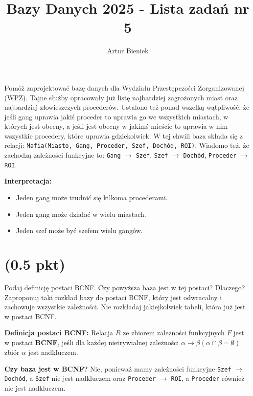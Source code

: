 \documentclass{article}
\begin{document}
\title{Bazy Danych 2025 - Lista zadań nr 5}
\author{Artur Bieniek}

\maketitle

Pomóż zaprojektować bazę danych dla Wydziału Przestępczości Zorganizowanej (WPZ). Tajne służby opracowały już listę najbardziej zagrożonych miast oraz najbardziej złowieszczych procederów. Ustalono też ponad wszelką wątpliwość, że jeśli gang uprawia jakiś proceder to uprawia go we wszystkich miastach, w których jest obecny, a jeśli jest obecny w jakimś mieście to uprawia w nim wszystkie procedery, które uprawia gdziekolwiek. W tej chwili baza składa się z relacji: \texttt{Mafia(Miasto, Gang, Proceder, Szef, Dochód, ROI)}. Wiadomo też, że zachodzą zależności funkcyjne to: \texttt{Gang} $\rightarrow$ \texttt{Szef}, \texttt{Szef} $\rightarrow$ \texttt{Dochód}, \texttt{Proceder} $\rightarrow$ \texttt{ROI}.

\textbf{Interpretacja:} \begin{itemize}
        \item Jeden gang może trudnić się kilkoma procederami.
        \item Jeden gang może działać w wielu miastach.
        \item Jeden szef może być szefem wielu gangów.
\end{itemize}

\section{(0.5 pkt)} Podaj definicję postaci BCNF. Czy powyższa baza jest w tej postaci? Dlaczego? Zaproponuj taki rozkład bazy do postaci BCNF, który jest odwracalny i zachowuje wszystkie zależności. Nie rozkładaj jakiejkolwiek tabeli, która już jest w postaci BCNF.

\textbf{Definicja postaci BCNF:}  Relacja $R$ ze zbiorem zależności funkcyjnych $F$ jest w postaci \textbf{BCNF}, jeśli dla każdej nietrywialnej zależności $\alpha \rightarrow \beta (\alpha \cap \beta = \emptyset)$ zbiór $\alpha$ jest nadkluczem.

\textbf{Czy baza jest w BCNF?} Nie, ponieważ mamy zależności funkcyjne \texttt{Szef} $\rightarrow$ \texttt{Dochód}, a \texttt{Szef} nie jest nadkluczem oraz \texttt{Proceder} $\rightarrow$ \texttt{ROI}, a \texttt{Proceder} również nie jest nadkluczem.
\end{document}
